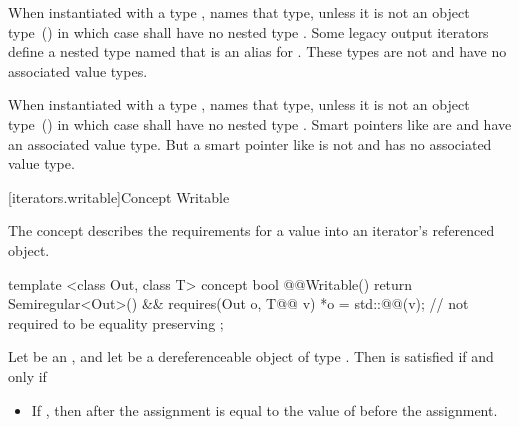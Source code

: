 \begin{addedblock}
\pnum
When instantiated with a type  
,
 names that type, unless it is not an object type~() in which case
 shall have no nested type . \enternote Some legacy output
iterators define a nested type named  that is an alias for . These
types are not  and have no associated value types.\exitnote

\pnum
When instantiated with a type  
,
 names that type, unless it is not an object type~() in which case
 shall have no nested type . \enternote Smart pointers like
 are  and have an associated value type. But a smart pointer
like  is not  and has no associated value type.\exitnote

[iterators.writable]{Concept Writable}

\pnum
The  concept describes the requirements for  a value into an iterator's
referenced object.

%
\begin{codeblock}
  template <class Out, class T>
  concept bool @@Writable() {
    return Semiregular<Out>() &&
      requires(Out o, T@\newtxt{\&\&}@ v) {
        *o = std::@@(v); // not required to be equality preserving
      };
  }
\end{codeblock}

\pnum
Let  be an  , and let 
be a dereferenceable object of type . Then  is satisfied if and only if

\begin{itemize}
\item If ,
then after the assignment is equal
to the value of  before the assignment.
\end{itemize}


\end{addedblock}
